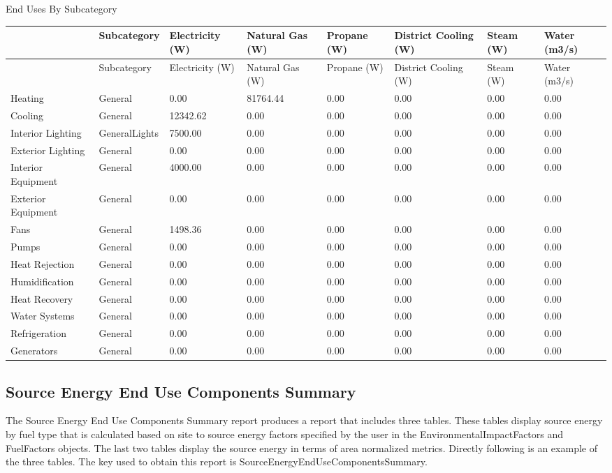 End Uses By Subcategory

{\scriptsize
\begin{longtable}[c]{>{\raggedright}p{0.75in}>{\raggedright}p{0.75in}>{\raggedright}p{0.75in}>{\raggedright}p{0.75in}>{\raggedright}p{0.75in}>{\raggedright}p{0.75in}>{\raggedright}p{0.75in}>{\raggedright}p{0.75in}}
\toprule 
~ & Subcategory & Electricity (W) & Natural Gas (W) & Propane (W) & District Cooling (W) & Steam (W) & Water (m3/s) \tabularnewline
\midrule
\endfirsthead

\toprule 
~ & Subcategory & Electricity (W) & Natural Gas (W) & Propane (W) & District Cooling (W) & Steam (W) & Water (m3/s) \tabularnewline
\midrule
\endhead

Heating & General & 0.00 & 81764.44 & 0.00 & 0.00 & 0.00 & 0.00 \tabularnewline
Cooling & General & 12342.62 & 0.00 & 0.00 & 0.00 & 0.00 & 0.00 \tabularnewline
Interior Lighting & GeneralLights & 7500.00 & 0.00 & 0.00 & 0.00 & 0.00 & 0.00 \tabularnewline
Exterior Lighting & General & 0.00 & 0.00 & 0.00 & 0.00 & 0.00 & 0.00 \tabularnewline
Interior Equipment & General & 4000.00 & 0.00 & 0.00 & 0.00 & 0.00 & 0.00 \tabularnewline
Exterior Equipment & General & 0.00 & 0.00 & 0.00 & 0.00 & 0.00 & 0.00 \tabularnewline
Fans & General & 1498.36 & 0.00 & 0.00 & 0.00 & 0.00 & 0.00 \tabularnewline
Pumps & General & 0.00 & 0.00 & 0.00 & 0.00 & 0.00 & 0.00 \tabularnewline
Heat Rejection & General & 0.00 & 0.00 & 0.00 & 0.00 & 0.00 & 0.00 \tabularnewline
Humidification & General & 0.00 & 0.00 & 0.00 & 0.00 & 0.00 & 0.00 \tabularnewline
Heat Recovery & General & 0.00 & 0.00 & 0.00 & 0.00 & 0.00 & 0.00 \tabularnewline
Water Systems & General & 0.00 & 0.00 & 0.00 & 0.00 & 0.00 & 0.00 \tabularnewline
Refrigeration & General & 0.00 & 0.00 & 0.00 & 0.00 & 0.00 & 0.00 \tabularnewline
Generators & General & 0.00 & 0.00 & 0.00 & 0.00 & 0.00 & 0.00 \tabularnewline
\bottomrule
\end{longtable}}

\subsection{Source Energy End Use Components Summary}\label{source-energy-end-use-components-summary}

The Source Energy End Use Components Summary report produces a report that includes three tables. These tables display source energy by fuel type that is calculated based on site to source energy factors specified by the user in the EnvironmentalImpactFactors and FuelFactors objects. The last two tables display the source energy in terms of area normalized metrics. Directly following is an example of the three tables. The key used to obtain this report is SourceEnergyEndUseComponentsSummary.

